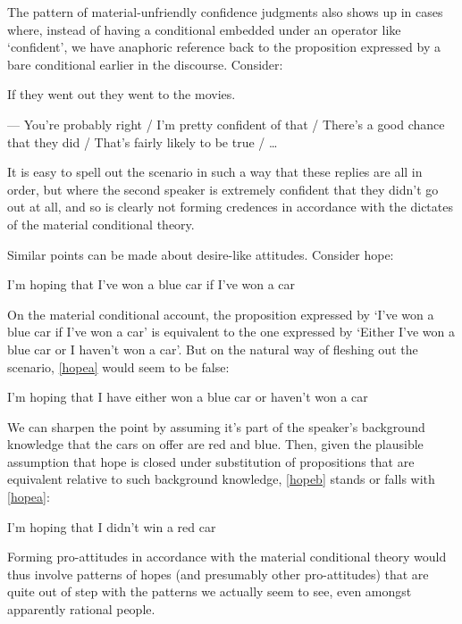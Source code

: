 \documentclass[If.tex]{subfiles}
\begin{document}
\begin{prop}
The pattern of material-unfriendly confidence judgments also shows up in cases where, instead of having a conditional embedded under an operator like ‘confident’, we have anaphoric reference back to the proposition expressed by a bare conditional earlier in the discourse.  Consider:
\begin{prop}
	\nitem
	If they went out they went to the movies.  
	
	--- You're probably right / I'm pretty confident of that / There's a good chance that they did / That's fairly likely to be true / … %
\end{prop}
It is easy to spell out the scenario in such a way that these replies are all in order, but where the second speaker is extremely confident that they didn't go out at all, and so is clearly not forming credences in accordance with the dictates of the material conditional theory.  

Similar points can be made about desire-like attitudes.  Consider hope:
\begin{prop}
	\nitem \label{hopeblue}
	I'm hoping that I've won a blue car if I've won a car
\end{prop}
On the material conditional account, the proposition expressed by ‘I've won a blue car if I've won a car’ is equivalent to the one expressed by ‘Either I've won a blue car or I haven't won a car’.  But on the natural way of fleshing out the scenario, \ref{hopea} would seem to be false:
\begin{prop}
	\nitem \label{hopea}
	I'm hoping that I have either won a blue car or haven't won a car	
\end{prop}
We can sharpen the point by assuming it's part of the speaker's background knowledge that the cars on offer are red and blue.  Then, given the plausible assumption that hope is closed under substitution of propositions that are equivalent relative to such background knowledge, \ref{hopeb} stands or falls with \ref{hopea}:
\begin{prop}
	\nitem \label{hopeb}
	I'm hoping that I didn't win a red car
\end{prop}
Forming pro-attitudes in accordance with the material conditional theory would thus involve patterns of hopes (and presumably other pro-attitudes) that are quite out of step with the patterns we actually seem to see, even amongst apparently rational people.  


\end{prop}
\end{document}
